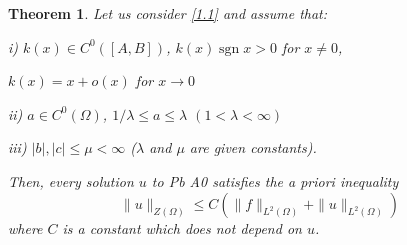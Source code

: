 \documentclass[a4paper,12pt,leqno]{article}
\newtheorem{theorem}[proposition]{Theorem}
\numberwithin{equation}{section}
\begin{document}
\begin{theorem} \label{TH:3.1}
	Let us consider \cref{1.1} and assume that:
	
	i) $k(x) \in C^{0}([A, B])$, $k(x) \operatorname{sgn} x>0$ for $x \neq 0$,
	
	\quad $k(x)=x+o(x)$ for $x \to 0$
	
	ii) $a \in C^{0}(\Omega)$, $1 / \lambda \leqslant a \leqslant \lambda$ $(1<\lambda<\infty)$
	
	iii) $|b|,|c| \leqslant \mu<\infty$ ($\lambda$ and $\mu$ are given constants).
	
	\noindent
	Then, every solution $u$ to Pb A0 satisfies the a priori inequality
	\begin{equation} \label{3.1}
		\|u\|_{Z(\Omega)} \leqslant C\left(\|f\|_{L^{2}(\Omega)}+\|u\|_{L^{2}(\Omega)}\right)
	\end{equation}
	where $C$ is a constant which does not depend on $u$.
\end{theorem}
\end{document}
